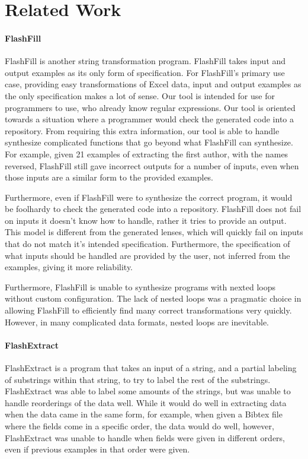 \documentclass[numbers,10pt,preprint\ifanon ,nocopyrightspace\fi]{sigplanconf}
\begin{document}
\section{Related Work}
\paragraph*{FlashFill}
FlashFill is another string transformation program.  FlashFill takes input and
output examples as its only form of specification.  For FlashFill's primary use
case, providing easy transformations of Excel data, input and output examples as
the only specification makes a lot of sense.  Our tool is intended for use for
programmers to use, who already know regular expressions.  Our tool is oriented
towards a situation where a programmer would check the generated code into a
repository.  From requiring this extra information, our tool is able to handle
synthesize complicated functions that go beyond what FlashFill can synthesize.
For example, given 21 examples of extracting the first author, with the names
reversed, FlashFill still gave incorrect outputs for a number of inputs, even
when those inputs are a similar form to the provided examples.

Furthermore, even if FlashFill were to synthesize the correct program, it would
be foolhardy to check the generated code into a repository.  FlashFill does not
fail on inputs it doesn't know how to handle, rather it tries to provide an
output.  This model is different from the generated lenses, which will quickly
fail on inputs that do not match it's intended specification.  Furthermore, the
specification of what inputs should be handled are provided by the user, not
inferred from the examples, giving it more reliability.

Furthermore, FlashFill is unable to synthesize programs with nexted loops
without custom configuration.  The lack of nested loops was a pragmatic choice
in allowing FlashFill
to efficiently find many correct transformations very quickly.  However, in
many complicated data formats, nested loops are inevitable. 

\paragraph*{FlashExtract}
FlashExtract is a program that takes an input of a string, and a partial
labeling of substrings within that string, to try to label the rest of the
substrings.  FlashExtract was able to label some amounts of the strings, but was
unable to handle reorderings of the data well.  While it would do well in
extracting data when the data came in the same form, for example, when given a
Bibtex file where the fields come in a specific order, the data would do well,
however, FlashExtract was unable to handle when fields were given in different
orders, even if previous examples in that order were given.
\end{document}
